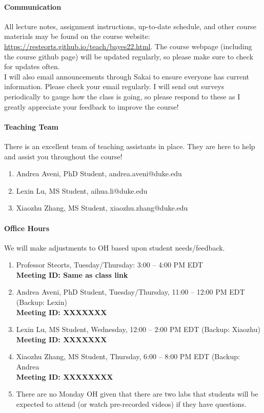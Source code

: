 \documentclass[11pt]{article}
\begin{document}
\paragraph{Communication} 
All lecture notes, assignment instructions, up-to-date schedule, and other course materials may be found on the course website: \url{https://resteorts.github.io/teach/bayes22.html}. The course webpage (including the course github page) will be updated regularly, so please make sure to check for updates often. \\

I will also email announcements through Sakai to ensure everyone has current information. Please check your email regularly. I will send out surveys periodically to gauge how the class is going, so please respond to these as I greatly appreciate your feedback to improve the course! 

\paragraph{Teaching Team}
There is an excellent team of teaching assistants in place. They are here to help and assist you throughout the course! 

\begin{enumerate}
\item Andrea Aveni, PhD Student, andrea.aveni@duke.edu
\item  Lexin Lu, MS Student, aihua.li@duke.edu
\item  Xiaozhu Zhang, MS Student, xiaozhu.zhang@duke.edu
\end{enumerate}


\paragraph{Office Hours}
We will make adjustments to OH based upon student needs/feedback. 
\begin{enumerate}
\item Professor Steorts, Tuesday/Thursday: 3:00 -- 4:00 PM EDT\\
\textbf{Meeting ID: Same as class link}
\item Andrea Aveni, PhD Student, Tuesday/Thursday, 11:00 -- 12:00 PM EDT (Backup: Lexin)\\
\textbf{Meeting ID: XXXXXXX}
\item Lexin Lu, MS Student, Wednesday, 12:00 -- 2:00 PM EDT  (Backup: Xiaozhu)\\
\textbf{Meeting ID: XXXXXXX}
\item Xiaozhu Zhang, MS Student, Thursday, 6:00 -- 8:00 PM EDT (Backup: Andrea\\
\textbf{Meeting ID: XXXXXXXX}
\item There are no Monday OH given that there are two labs that students will be expected to attend (or watch pre-recorded videos) if they have questions. 
\end{enumerate}
\end{document}
